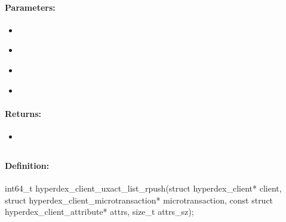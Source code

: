 \paragraph{Parameters:}
\begin{itemize}[noitemsep]
\item {}\\

\item {}\\

\item {}\\

\item {}\\

\end{itemize}

\paragraph{Returns:}
\begin{itemize}[noitemsep]
\item {}\\

\end{itemize}

\pagebreak
\subsection{}
\label{api:c:uxact_list_rpush}


\paragraph{Definition:}
\begin{ccode}
int64_t hyperdex_client_uxact_list_rpush(struct hyperdex_client* client,
        struct hyperdex_client_microtransaction* microtransaction,
        const struct hyperdex_client_attribute* attrs, size_t attrs_sz);
\end{ccode}

